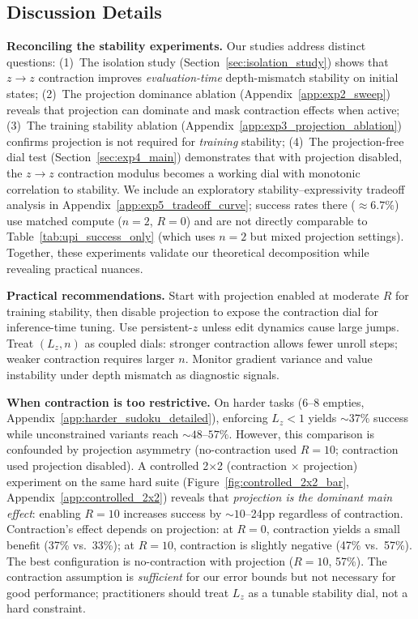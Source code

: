 \documentclass{article}
\theoremstyle{plain}
\theoremstyle{definition}
\theoremstyle{remark}
\begin{document}
\subsection{Discussion Details}
\label{app:discussion_details}

\textbf{Reconciling the stability experiments.}
Our studies address distinct questions:
(1)~The isolation study (Section~\ref{sec:isolation_study}) shows that $z\!\to\!z$ contraction improves \emph{evaluation-time} depth-mismatch stability on initial states;
(2)~The projection dominance ablation (Appendix~\ref{app:exp2_sweep}) reveals that projection can dominate and mask contraction effects when active;
(3)~The training stability ablation (Appendix~\ref{app:exp3_projection_ablation}) confirms projection is not required for \emph{training} stability;
(4)~The projection-free dial test (Section~\ref{sec:exp4_main}) demonstrates that with projection disabled, the $z\!\to\!z$ contraction modulus becomes a working dial with monotonic correlation to stability.
We include an exploratory stability--expressivity tradeoff analysis in Appendix~\ref{app:exp5_tradeoff_curve}; success rates there (${\approx}6.7\%$) use matched compute ($n{=}2$, $R{=}0$) and are not directly comparable to Table~\ref{tab:upi_success_only} (which uses $n{=}2$ but mixed projection settings).
Together, these experiments validate our theoretical decomposition while revealing practical nuances.

\textbf{Practical recommendations.}
Start with projection enabled at moderate $R$ for training stability, then disable projection to expose the contraction dial for inference-time tuning.
Use persistent-$z$ unless edit dynamics cause large jumps.
Treat $(L_z, n)$ as coupled dials: stronger contraction allows fewer unroll steps; weaker contraction requires larger $n$.
Monitor gradient variance and value instability under depth mismatch as diagnostic signals.

\textbf{When contraction is too restrictive.}
On harder tasks (6--8 empties, Appendix~\ref{app:harder_sudoku_detailed}), enforcing $L_z < 1$ yields ${\sim}37\%$ success while unconstrained variants reach ${\sim}48$--$57\%$.
However, this comparison is confounded by projection asymmetry (no-contraction used $R{=}10$; contraction used projection disabled).
A controlled 2$\times$2 (contraction $\times$ projection) experiment on the same hard suite (Figure~\ref{fig:controlled_2x2_bar}, Appendix~\ref{app:controlled_2x2}) reveals that \emph{projection is the dominant main effect}: enabling $R{=}10$ increases success by ${\sim}10$--24pp regardless of contraction.
Contraction's effect depends on projection: at $R{=}0$, contraction yields a small benefit (37\% vs.\ 33\%); at $R{=}10$, contraction is slightly negative (47\% vs.\ 57\%).
The best configuration is no-contraction with projection ($R{=}10$, 57\%).
The contraction assumption is \emph{sufficient} for our error bounds but not necessary for good performance; practitioners should treat $L_z$ as a tunable stability dial, not a hard constraint.
\end{document}
